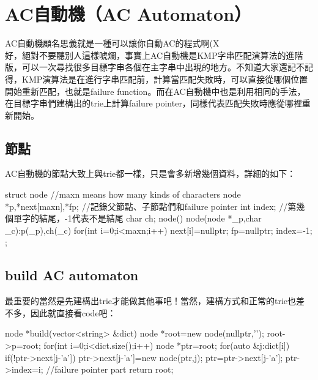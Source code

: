 \section{AC自動機（AC Automaton）}
AC自動機顧名思義就是一種可以讓你自動AC的程式啊(X\\

好，絕對不要聽別人這樣唬爛，事實上AC自動機是KMP字串匹配演算法的進階版，可以一次尋找很多目標字串各個在主字串中出現的地方。不知道大家還記不記得，KMP演算法是在進行字串匹配前，計算當匹配失敗時，可以直接從哪個位置開始重新匹配，也就是failure function。而在AC自動機中也是利用相同的手法，在目標字串們建構出的trie上計算failure pointer，同樣代表匹配失敗時應從哪裡重新開始。
\subsection{節點}
AC自動機的節點大致上與trie都一樣，只是會多新增幾個資料，詳細的如下：
\begin{C++}
struct node{ //maxn means how many kinds of characters
	node *p,*next[maxn],*fp; //記錄父節點、子節點們和failure pointer
    int index; //第幾個單字的結尾，-1代表不是結尾
    char ch;
    node(){}
    node(node *_p,char _c):p(_p),ch(_c){
        for(int i=0;i<maxn;i++) next[i]=nullptr;
        fp=nullptr; index=-1;
    }
};
\end{C++}
\subsection{build AC automaton}
最重要的當然是先建構出trie才能做其他事吧！當然，建構方式和正常的trie也差不多，因此就直接看code吧：
\begin{C++}
node *build(vector<string> &dict){
    node *root=new node(nullptr,'\0');
    root->p=root;
    for(int i=0;i<dict.size();i++){
        node *ptr=root;
        for(auto &j:dict[i]){
            if(!ptr->next[j-'a'])
                ptr->next[j-'a']=new node(ptr,j);
            ptr=ptr->next[j-'a'];
        }
        ptr->index=i;
    }
    //failure pointer part
    return root;
}
\end{C++}
